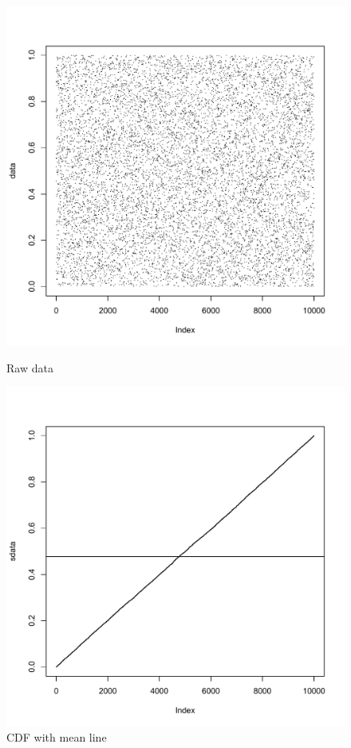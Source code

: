 \documentclass[11pt]{article}
\begin{document}
\begin{figure}[ht]
\begin{minipage}[b]{0.45\linewidth}
\centering
\includegraphics[scale=.42]{b4564raw.pdf}
\caption{Raw data}
\label{fig:figure5}
\end{minipage}
\begin{minipage}[b]{0.45\linewidth}
\centering
\includegraphics[scale=.42]{b4564cdf.pdf}
\caption{CDF with mean line}
\label{fig:figure6}
\end{minipage}


\end{figure}
\end{document}
